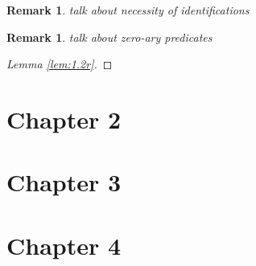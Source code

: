 \documentclass{article}
\newtheorem{remark}[theorem]{Remark}
\theoremstyle{nonumberplain}
\newtheorem{proof}{Proof}
\begin{document}
\begin{remark}
talk about necessity of identifications
\end{remark}

\begin{remark}
talk about zero-ary predicates
\end{remark}

\begin{proof}[Lemma \ref{lem:1.2r}]

\end{proof}


\section{Chapter 2}\label{sec:ch2}

\section{Chapter 3}\label{sec:ch3}

\section{Chapter 4}\label{sec:ch4}




\end{document}
